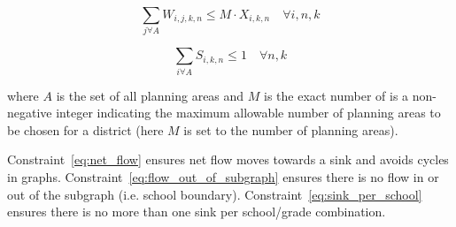 \documentclass[12pt]{article}
\begin{document}
\begin{equation} \label{eq:flow_out_of_subgraph}
	\displaystyle\sum_{j \forall A} W_{i,j,k,n} \leq M \cdot X_{i,k,n} \quad \forall i,n,k
\end{equation}

\begin{equation} \label{eq:sink_per_school}
	\displaystyle\sum_{i \forall A} S_{i,k,n} \leq 1 \quad \forall n,k
\end{equation}

where $A$ is the set of all planning areas and $M$ is the exact number of is a non-negative integer indicating the maximum allowable number of planning areas to be chosen for a district (here $M$ is set to the number of planning areas).

Constraint~\ref{eq:net_flow} ensures net flow moves towards a sink and avoids cycles in graphs.
Constraint~\ref{eq:flow_out_of_subgraph} ensures there is no flow in or out of the subgraph (i.e. school boundary).
Constraint~\ref{eq:sink_per_school} ensures there is no more than one sink per school/grade combination.
\end{document}
